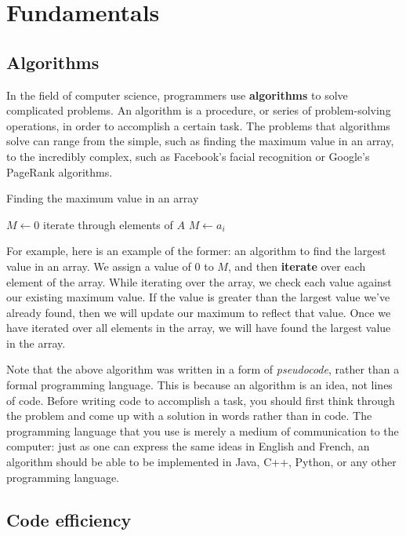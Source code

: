 \chapter{Fundamentals}

\section{Algorithms}

In the field of computer science, programmers use \textbf{algorithms} to solve complicated problems. An algorithm is a procedure, or series of problem-solving operations, in order to accomplish a certain task. The problems that algorithms solve can range from the simple, such as finding the maximum value in an array, to the incredibly complex, such as Facebook's facial recognition or Google's PageRank algorithms.

\begin{algorithm}[H]
\caption{Finding the maximum value in an array}
\begin{algorithmic}
\State $M \gets 0$
 \Comment iterate through elements of $A$
        \State $M \gets a_i$
    \EndIf
\EndFor
\end{algorithmic}
\end{algorithm}

For example, here is an example of the former: an algorithm to find the largest value in an array.  We assign a value of $ 0 $ to $ M $, and then \textbf{iterate} over each element of the array. While iterating over the array, we check each value against our existing maximum value.  If the value is greater than the largest value we've already found, then we will update our maximum to reflect that value.  Once we have iterated over all elements in the array, we will have found the largest value in the array.

Note that the above algorithm was written in a form of \textit{pseudocode}, rather than a formal programming language.  This is because an algorithm is an idea, not lines of code. Before writing code to accomplish a task, you should first think through the problem and come up with a solution in words rather than in code. The programming language that you use is merely a medium of communication to the computer: just as one can express the same ideas in English and French, an algorithm should be able to be implemented in Java, C++, Python, or any other programming language.


\section{Code efficiency}


